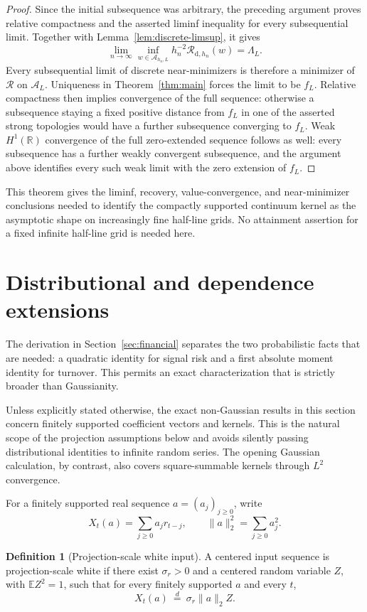 \documentclass[11pt]{amsart}
\theoremstyle{definition}
\newtheorem{definition}[theorem]{Definition}
\theoremstyle{remark}
\newcommand{\Rcal}{\mathcal R}
\begin{document}
\begin{proof}
Since the initial subsequence was arbitrary, the preceding argument proves
relative compactness and the asserted liminf inequality for every
subsequential limit. Together with Lemma~\ref{lem:discrete-limsup}, it gives
\[
 \lim_{n\to\infty}\inf_{w\in\mathcal A_{h_n,L}}
 h_n^{-2}\Rcal_{\mathrm d,h_n}(w)=\Lambda_L.
\]
Every subsequential limit of discrete near-minimizers is therefore a minimizer of
$\Rcal$ on $\mathcal A_L$. Uniqueness in Theorem~\ref{thm:main} forces the limit
to be $f_L$. Relative compactness then implies convergence of the full sequence:
otherwise a subsequence staying a fixed positive distance from $f_L$ in one of
the asserted strong topologies would have a further subsequence converging to
$f_L$. Weak $H^1(\mathbb R)$ convergence of the full zero-extended sequence
follows as well: every subsequence has a further weakly convergent subsequence,
and the argument above identifies every such weak limit with the zero extension
of $f_L$.
\end{proof}

This theorem gives the liminf, recovery, value-convergence, and near-minimizer
conclusions needed to identify the compactly supported continuum kernel as the
asymptotic shape on increasingly fine half-line grids. No attainment assertion
for a fixed infinite half-line grid is needed here.


\section{Distributional and dependence extensions}\label{app:extensions}
The derivation in Section~\ref{sec:financial} separates the two probabilistic facts
that are needed: a quadratic identity for signal risk and a first absolute
moment identity for turnover. This permits an exact characterization that is
strictly broader than Gaussianity.

Unless explicitly stated otherwise, the exact non-Gaussian results in this
section concern finitely supported coefficient vectors and kernels. This is
the natural scope of the projection assumptions below and avoids silently
passing distributional identities to infinite random series. The opening
Gaussian calculation, by contrast, also covers square-summable kernels through
$L^2$ convergence.

For a finitely supported real sequence $a=(a_j)_{j\geq0}$, write
\[
 X_t(a)=\sum_{j\geq0}a_jr_{t-j},
 \qquad \|a\|_2^2=\sum_{j\geq0}a_j^2.
\]

\begin{definition}[Projection-scale white input]\label{def:projection-scale}
A centered input sequence is projection-scale white if there exist
$\sigma_r>0$ and a centered random variable $Z$, with $\mathbb E Z^2=1$, such
that for every finitely supported $a$ and every $t$,
\begin{equation}\label{eq:projection-scale}
 X_t(a)\ \overset{d}=\ \sigma_r\|a\|_2 Z.
\end{equation}
\end{definition}
\end{document}
